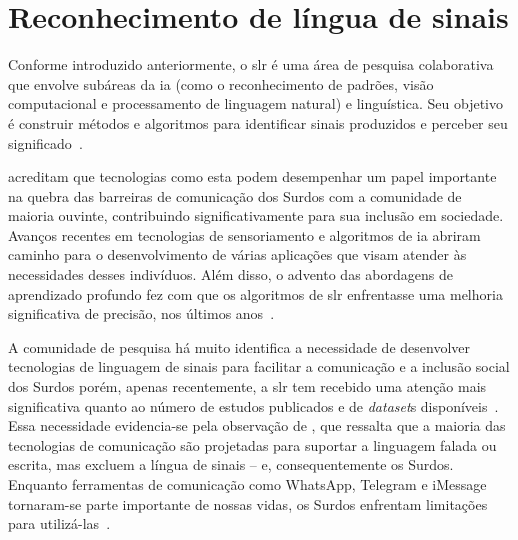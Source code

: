 \section{Reconhecimento de língua de sinais}
\label{sec:slr}

Conforme introduzido anteriormente, o \acrfull{slr} é uma área de pesquisa colaborativa que envolve subáreas da \acrfull{ia} (como o reconhecimento de padrões, visão computacional e processamento de linguagem natural) e linguística. Seu objetivo é construir métodos e algoritmos para identificar sinais produzidos e perceber seu significado~\cite{wadhawan-2019-slr-literature-review}. 

 acreditam que tecnologias como esta podem desempenhar um papel importante na quebra das barreiras de comunicação dos Surdos com a comunidade de maioria ouvinte, contribuindo significativamente para sua inclusão em sociedade. Avanços recentes em tecnologias de sensoriamento e algoritmos de \acrshort{ia} abriram caminho para o desenvolvimento de várias aplicações que visam atender às necessidades desses indivíduos. Além disso, o advento das abordagens de aprendizado profundo fez com que os algoritmos de \acrshort{slr} enfrentasse uma melhoria significativa de precisão, nos últimos anos~\cite{papastratis-2021-ai-technologies-sl,rastgoo-2021-slr-deep-survey,bragg-2019-slr-interdisciplinary}.

A comunidade de pesquisa há muito identifica a necessidade de desenvolver tecnologias de linguagem de sinais para facilitar a comunicação e a inclusão social dos Surdos porém, apenas recentemente, a \acrshort{slr} tem recebido uma atenção mais significativa quanto ao número de estudos publicados e de \textit{dataset}s disponíveis~\cite{papastratis-2021-ai-technologies-sl,koller-2020-quantitative-survey-slr}.
Essa necessidade evidencia-se pela observação de , que ressalta que a maioria das tecnologias de comunicação são projetadas para suportar a linguagem falada ou escrita, mas excluem a língua de sinais -- e, consequentemente os Surdos. Enquanto ferramentas de comunicação como WhatsApp, Telegram e iMessage tornaram-se parte importante de nossas vidas, os Surdos enfrentam limitações para utilizá-las~\cite{rastgoo-2021-slr-deep-survey,bragg-2019-slr-interdisciplinary}.



